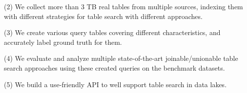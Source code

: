 \noindent (2) We collect more than 3 TB real tables from multiple sources, indexing them with different strategies for table search with different approaches.  

\noindent (3) We create various query tables covering different characteristics, and accurately label ground truth for them.

\noindent (4) We evaluate and analyze multiple state-of-the-art joinable/unionable table search approaches using these created queries on the benchmark datasets.

\noindent (5) We build a use-friendly API to well support table search in data lakes. 

  
